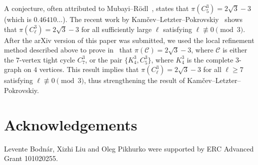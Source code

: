 \documentclass[11pt,a4paper]{article}
\theoremstyle{remark}
\newcommand{\hide}[1]{}
\begin{document}
\hide{
In a way, Proposition~\ref{pr:4} can also be regarded as Step 3 of this method where Step~1 did not require any computer calculations since the last step could be carried out with a very weak similarity assumption of Item~\ref{it:42} of Proposition~\ref{pr:4} (namely that the number of crossing pairs is at least $(\frac1{16}+o(1))n^2$, which is rather far from $(\frac19+o(1))n^2$ observed in the conjectured construction).
}

\hide{
A conjecture, often attributed to Mubayi--R\"{o}dl~\cite{MR02}, states that $\pi(C_{5}^{3}) = 2\sqrt{3} - 3$ (which is $0.46410...$). 
Recent work by Kam{\v c}ev--Letzter--Pokrovskiy~\cite{KLP24} shows that $\pi(C_{\ell}^{3}) = 2\sqrt{3} - 3$ for all sufficiently large $\ell$ satisfying $\ell \not\equiv 0 \pmod{3}$. 
The floating-point calculations indicate that it might be possible to prove that $\pi(\{K_{4}^{3}, C_{5}^{3}\})=2\sqrt{3} - 3$ and to improve the upper bound for $\pi(C_{5}^{3})$ to $2\sqrt{3} - 3 + 0.00053$. 
It seems plausible that, after a rounding process (which we have not yet attempted), it could be shown that $\pi(\{K_{4}^{3}, C_{5}^{3}\}) = 2\sqrt{3} - 3$. Such a result would imply that $\pi(C_{\ell}^{3}) = 2\sqrt{3} - 3$ for all $\ell \ge 8$ satisfying $\ell \not\equiv 0 \pmod{3}$, thus strengthening the result of Kam{\v c}ev--Letzter--Pokrovskiy.
Additionally, the upper bound for $\pi(C_{5}^{3})$ could likely be further refined or even determined exactly with additional effort. We hope to return to this topic in the future. }

A conjecture, often attributed to Mubayi--R\"{o}dl~\cite{MR02}, states that $\pi(C_{5}^{3}) = 2\sqrt{3} - 3$ (which is $0.46410...$). 
The recent work by Kam{\v c}ev--Letzter--Pokrovskiy~\cite{KLP24} shows that $\pi(C_{\ell}^{3}) = 2\sqrt{3} - 3$ for all sufficiently large $\ell$ satisfying $\ell \not\equiv 0 \pmod{3}$. After the arXiv version of this paper was submitted, we used the local refinement method described above to prove in~\cite{BLLP25} that $\pi(\mathcal{C})=2\sqrt{3} - 3$, where $\mathcal{C}$ is either the $7$-vertex tight cycle $C_{7}^{3}$, or the pair $\{K_{4}^{3}, C_{5}^{3}\}$, where $K_4^3$ is the complete $3$-graph on $4$ vertices.
This result implies that $\pi(C_{\ell}^{3}) = 2\sqrt{3} - 3$ for all $\ell \ge 7$ satisfying $\ell \not\equiv 0 \pmod{3}$, thus strengthening the result of Kam{\v c}ev--Letzter--Pokrovskiy.

\section*{Acknowledgements}

Levente Bodn\'ar, Xizhi Liu and Oleg Pikhurko were supported by ERC Advanced Grant 101020255.


\end{document}
